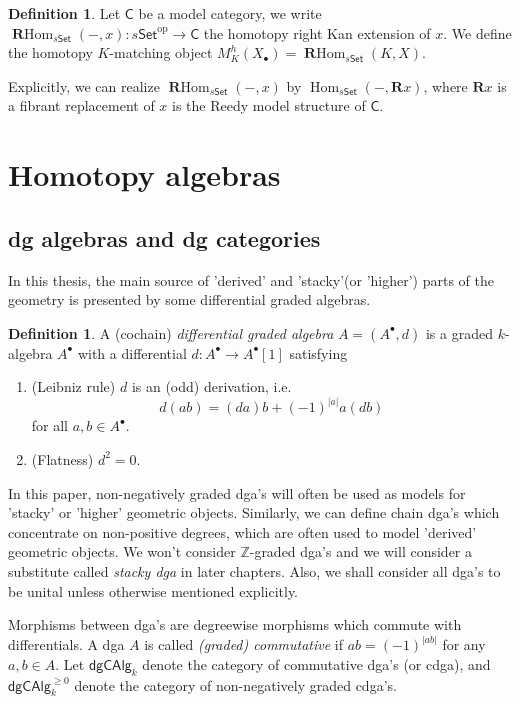 \documentclass[12pt]{amsart}
\theoremstyle{definition}
\newtheorem{defn}[thm]{Definition}
\theoremstyle{remark}
\numberwithin{equation}{section}
\newcommand{\CC}{{\mathsf C}}
\newcommand{\BR}{{\mathbf R}}
\newcommand{\Z}{{\mathbb{Z}}}
\newcommand{\1}{{\mathbb{1}}}
\newcommand{\op}{\operatorname{op}}
\newcommand{\set}{\mathsf{Set}}
\newcommand{\dgcalg}{\mathsf{dgCAlg}}
\newcommand{\bt}{\bullet}
\newcommand{\Hom}{\operatorname{Hom}}
\newcommand{\rhom}{\operatorname{\mathbf{R}Hom}}
\begin{document}
\begin{defn}
    Let $\CC$ be a model category, we write $\rhom_{s\set}(-,x):s\set^{\op} \to \CC$ the homotopy right Kan extension of $x$. We define the homotopy $K$-matching object $M_K^h(X_{\bt}) = \rhom_{s\set}(K, X)$. 
\end{defn}
Explicitly, we can realize $\rhom_{s\set}(-,x)$ by $\Hom_{s\set}(-, \BR x)$, where $\BR x$ is a fibrant replacement of $x$ is the Reedy model structure of $\CC$. 


\section{Homotopy algebras}
     \subsection{dg algebras and dg categories}
    In this thesis, the main source of 'derived' and 'stacky'(or 'higher') parts of the geometry is presented by some differential graded algebras. 
    \begin{defn}
    A (cochain) {\it differential graded algebra} $A= ( A^{\bt}, d)$ is a graded $k$-algebra $A^{\bt}$ with a differential $d: A^{\bt}\to A^{\bt}[1]$ satisfying
    \begin{enumerate}
        \item (Leibniz rule) $d$ is an (odd) derivation, i.e.
        \begin{equation*}
            d(ab) = (da)b + (-1)^{|a|}a(db)
        \end{equation*}
        for all $a, b \in A^{\bt}$.
        \item (Flatness) $d^2=0$.
    \end{enumerate}
    \end{defn}
    In this paper, non-negatively graded dga's will often be used as models for 'stacky' or 'higher' geometric objects. 
    Similarly, we can define chain dga's which concentrate on non-positive degrees, which are often used to model 'derived' geometric objects. We won't consider $\Z$-graded dga's and we will consider a substitute called {\it stacky dga} in later chapters. Also, we shall consider all dga's to be unital unless otherwise mentioned explicitly.
    
    Morphisms between dga's  are degreewise morphisms which commute with differentials. A dga $A$ is called {\it (graded) commutative} if $ ab = (-1)^{|ab|}$ for any $a, b \in A$. Let $\dgcalg_k$ denote the category of commutative dga's (or cdga), and  $\dgcalg_k^{\ge 0}$ denote the category of non-negatively graded cdga's.
    
\end{document}
